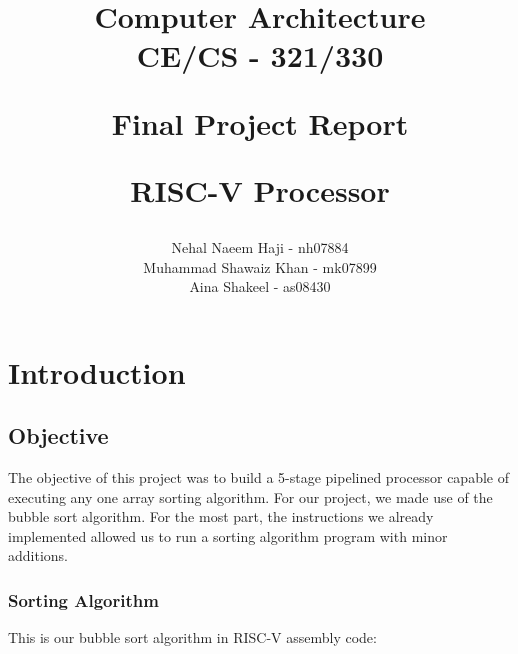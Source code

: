 \documentclass{report}
\title{{\huge \textbf{Computer Architecture \\ CE/CS - 321/330 }}

\vspace*{2mm}
{\LARGE \textbf{Final Project Report}}

{\Large \textbf{RISC-V Processor}} \\
\author{Nehal Naeem Haji - nh07884 \\ Muhammad Shawaiz Khan - mk07899 \\ Aina Shakeel - as08430}}
\begin{document}
\maketitle

\tableofcontents

\chapter{Introduction}
\section{Objective}

The objective of this project was to build a 5-stage pipelined processor capable of executing any one array sorting algorithm. For our project, we made use of the bubble sort algorithm. For the most part, the instructions we already implemented allowed us to run a sorting algorithm program with minor additions. 

\newpage
\subsection{Sorting Algorithm}

This is our bubble sort algorithm in RISC-V assembly code:
\end{document}
